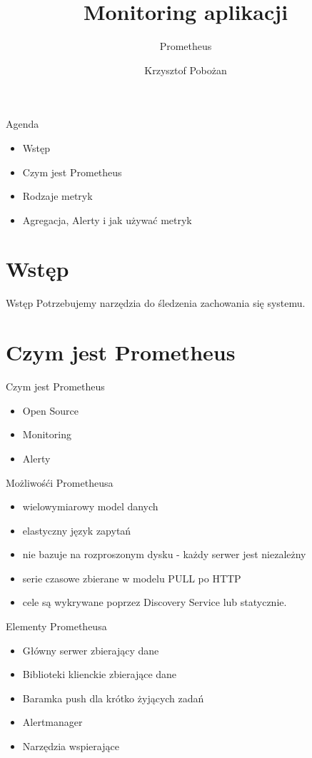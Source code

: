 \documentclass[epic,eepic,aspectratio=169,12pt]{beamer}
\begin{document}
	\title{Monitoring aplikacji}
	\subtitle{Prometheus}
	\author{Krzysztof Pobożan}
\begin{frame}
	\maketitle
\end{frame}
\begin{frame}{Agenda}
	\begin{itemize}
		\item Wstęp
		\item Czym jest Prometheus
		\item Rodzaje metryk
		\item Agregacja, Alerty i jak używać metryk

	\end{itemize}
\end{frame}
\section{Wstęp}
\begin{frame}{Wstęp}
	Potrzebujemy narzędzia do śledzenia zachowania się systemu.
\end{frame}
\section{Czym jest Prometheus}
\begin{frame}{Czym jest Prometheus}
	\begin{itemize}
		\item Open Source \pause
		\item Monitoring \pause		
		\item Alerty
	\end{itemize}
\end{frame}
\begin{frame}{Możliwośći Prometheusa}
	\begin{itemize}
		\item  wielowymiarowy model danych
		\item  elastyczny język zapytań
		\item nie bazuje na rozproszonym dysku - każdy serwer jest niezależny
		\item serie czasowe zbierane w modelu PULL po HTTP
		\item cele są wykrywane poprzez Discovery Service lub statycznie.
	\end{itemize}
\end{frame}
\begin{frame}{Elementy Prometheusa}
	\begin{itemize}
		\item Główny serwer zbierający dane
		\item Biblioteki klienckie zbierające dane
		\item Baramka push dla krótko żyjących zadań
		\item Alertmanager
		\item Narzędzia wspierające
	\end{itemize}
\end{frame}
\end{document}
